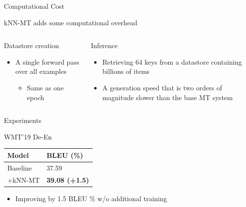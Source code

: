 \documentclass[unicode, 12pt, xdvipdfmx, aspectratio=169]{beamer}
\begin{document}
\begin{frame}[label={sec:org04edca3},t]{Computational Cost}
\begin{block}{kNN-MT adds some computational overhead}
\begin{columns}
\begin{column}[t]{0.5\columnwidth}
\begin{block}{Datastore creation}
\begin{itemize}
\item A single forward pass over all examples
\begin{itemize}
\item Same as one epoch
\end{itemize}
\end{itemize}
\end{block}
\end{column}
\begin{column}[t]{0.5\columnwidth}
\begin{block}{Inference}
\begin{itemize}
\item Retrieving 64 keys from a datastore containing billions of items
\item A generation speed that is two orders of magnitude slower than the base MT system
\end{itemize}
\end{block}
\end{column}
\end{columns}
\end{block}
\end{frame}

\begin{frame}[label={sec:org598022f}]{Experiments}
\begin{block}{WMT'19 De-En}
\begin{center}
\begin{tabular}{ll}
\toprule
Model & BLEU (\%)\\
\midrule
Baseline & 37.59\\
+kNN-MT & \textbf{39.08 (+1.5)}\\
\bottomrule
\end{tabular}
\end{center}

\begin{itemize}
\item Improving by 1.5 BLEU \% w/o additional training
\end{itemize}
\end{block}
\end{frame}
\end{document}
